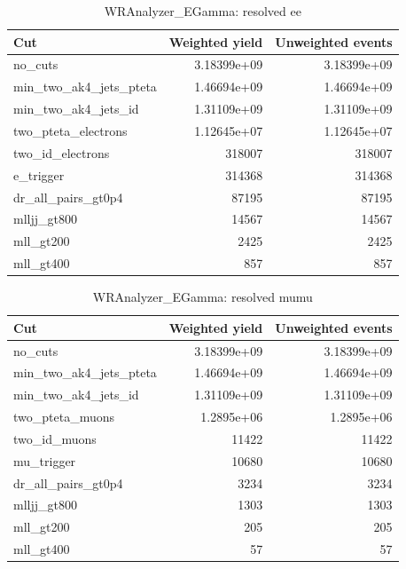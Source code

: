 \documentclass{article}
\begin{document}
\begin{table}[htbp]
\centering
\caption{WRAnalyzer\_EGamma: resolved ee}
\begin{tabular}{lrr}
\hline
Cut & Weighted yield & Unweighted events \\
\hline
no\_cuts & 3.18399e+09 & 3.18399e+09 \\
min\_two\_ak4\_jets\_pteta & 1.46694e+09 & 1.46694e+09 \\
min\_two\_ak4\_jets\_id & 1.31109e+09 & 1.31109e+09 \\
two\_pteta\_electrons & 1.12645e+07 & 1.12645e+07 \\
two\_id\_electrons & 318007 & 318007 \\
e\_trigger & 314368 & 314368 \\
dr\_all\_pairs\_gt0p4 & 87195 & 87195 \\
mlljj\_gt800 & 14567 & 14567 \\
mll\_gt200 & 2425 & 2425 \\
mll\_gt400 & 857 & 857 \\
\hline
\end{tabular}
\end{table}

\begin{table}[htbp]
\centering
\caption{WRAnalyzer\_EGamma: resolved mumu}
\begin{tabular}{lrr}
\hline
Cut & Weighted yield & Unweighted events \\
\hline
no\_cuts & 3.18399e+09 & 3.18399e+09 \\
min\_two\_ak4\_jets\_pteta & 1.46694e+09 & 1.46694e+09 \\
min\_two\_ak4\_jets\_id & 1.31109e+09 & 1.31109e+09 \\
two\_pteta\_muons & 1.2895e+06 & 1.2895e+06 \\
two\_id\_muons & 11422 & 11422 \\
mu\_trigger & 10680 & 10680 \\
dr\_all\_pairs\_gt0p4 & 3234 & 3234 \\
mlljj\_gt800 & 1303 & 1303 \\
mll\_gt200 & 205 & 205 \\
mll\_gt400 & 57 & 57 \\
\hline
\end{tabular}
\end{table}
\end{document}
